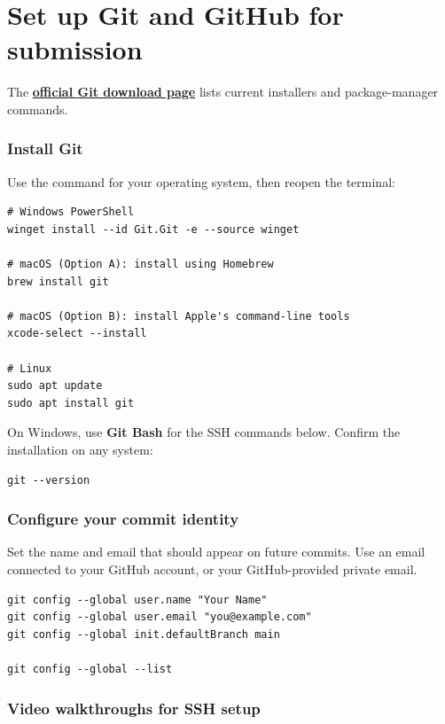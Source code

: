 \chapter{Set up Git and GitHub for submission}
\label{ch:git-submission}

The \href{https://git-scm.com/install/}{\textbf{official Git download page}} lists current installers and package-manager commands.

\subsection{Install Git}

Use the command for your operating system, then reopen the terminal:

\begin{lstlisting}[style=utpterminal]
# Windows PowerShell
winget install --id Git.Git -e --source winget

# macOS (Option A): install using Homebrew
brew install git

# macOS (Option B): install Apple's command-line tools
xcode-select --install

# Linux
sudo apt update
sudo apt install git
\end{lstlisting}

On Windows, use \textbf{Git Bash} for the SSH commands below. Confirm the installation on any system:

\begin{lstlisting}[style=utpterminal]
git --version
\end{lstlisting}

\subsection{Configure your commit identity}

Set the name and email that should appear on future commits. Use an email
connected to your GitHub account, or your GitHub-provided private email.

\begin{lstlisting}[style=utpterminal]
git config --global user.name "Your Name"
git config --global user.email "you@example.com"
git config --global init.defaultBranch main

git config --global --list
\end{lstlisting}

\subsection{Video walkthroughs for SSH setup}

